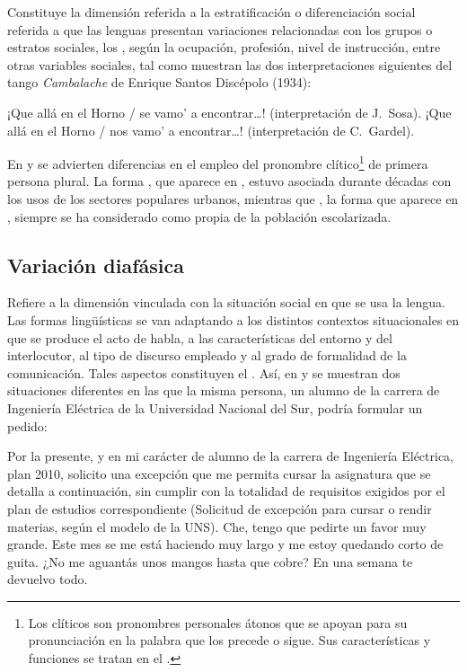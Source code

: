 Constituye la dimensión referida a la estratificación o diferenciación social
referida a que las lenguas presentan variaciones relacionadas con los grupos o
estratos sociales, los , según la ocupación, profesión,
nivel de instrucción, entre otras variables sociales, tal como muestran las dos
interpretaciones siguientes del tango \textit{Cambalache} de Enrique Santos
Discépolo (1934):

\begin{exe}
  \ex\label{ex:02-sosa} ¡Que allá en el Horno / se vamo' a encontrar\ldots!
      (interpretación de J.~Sosa).
  \ex\label{ex:02-gardel} ¡Que allá en el Horno / nos vamo' a encontrar\ldots!
      (interpretación de C.~Gardel).
\end{exe}

En  y  se advierten diferencias en el
empleo del pronombre clítico\footnote{Los clíticos son pronombres personales
átonos que se apoyan para su pronunciación en la palabra que los precede o
sigue. Sus características y funciones se tratan en el .} de primera
persona plural. La forma , que aparece en , estuvo
asociada durante décadas con los usos de los sectores populares urbanos,
mientras que , la forma que aparece en , siempre
se ha considerado como propia de la población escolarizada.

\subsection{Variación diafásica}\label{sec:02-diafasica}

Refiere a la dimensión vinculada con la situación social en que se usa la
lengua. Las formas lingüísticas se van adaptando a los distintos contextos
situacionales en que se produce el acto de habla, a las características del
entorno y del interlocutor, al tipo de discurso empleado y al grado de
formalidad de la comunicación. Tales aspectos constituyen el
. Así, en  y  se
muestran dos situaciones diferentes en las que la misma persona, un alumno de la
carrera de Ingeniería Eléctrica de la Universidad Nacional del Sur, podría
formular un pedido:

\begin{exe}
  \ex\label{ex:02-solicitud} Por la presente, y en mi carácter de alumno de la
      carrera de Ingeniería Eléctrica, plan 2010, solicito una excepción que me
      permita cursar la asignatura que se detalla a continuación, sin cumplir
      con la totalidad de requisitos exigidos por el plan de estudios
      correspondiente (Solicitud de excepción para cursar o rendir materias,
      según el modelo de la UNS).
  \ex\label{ex:02-guita} Che, tengo que pedirte un favor muy grande. Este mes se
      me está haciendo muy largo y me estoy quedando corto de guita. ¿No me
      aguantás unos mangos hasta que cobre? En una semana te devuelvo todo.
\end{exe}

